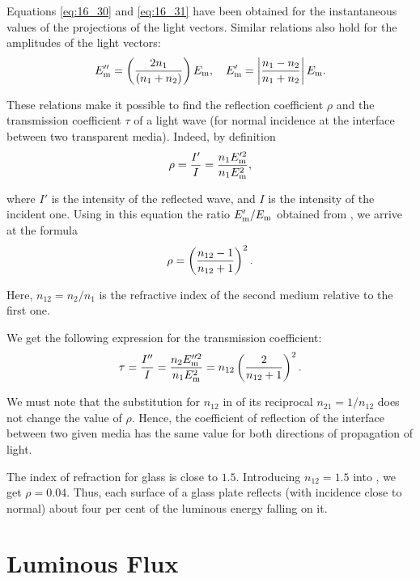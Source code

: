 Equations \eqref{eq:16_30} and \eqref{eq:16_31} have been obtained for the instantaneous values of the projections of the light vectors.
Similar relations also hold for the amplitudes of the light vectors:
\begin{equation}\label{eq:16_32}
    E_{\text{m}}'' = \left(\frac{2 n_1}{(n_1 + n_2)}\right) E_{\text{m}},\quad E_{\text{m}}' = \left| \frac{n_1 - n_2}{n_1 + n_2} \right| E_{\text{m}}.
\end{equation}

\noindent
These relations make it possible to find the reflection coefficient $\rho$ and the transmission coefficient $\tau$ of a light wave (for normal incidence at the interface between two transparent media).
Indeed, by definition
\begin{equation*}
    \rho = \frac{I'}{I} = \frac{n_1 E_{\text{m}}'^2}{n_1 E_{\text{m}}^2},
\end{equation*}

\noindent
where $I'$ is the intensity of the reflected wave, and $I$ is the intensity of the incident one.
Using in this equation the ratio $E_{\text{m}}'/E_{\text{m}}$ obtained from , we arrive at the formula
\begin{equation}\label{eq:16_33}
    \rho = \left(\frac{n_{12} - 1}{n_{12} + 1}\right)^2.
\end{equation}

\noindent
Here, $n_{12} = n_2/n_1$ is the refractive index of the second medium relative to the first one.

We get the following expression for the transmission coefficient:
\begin{equation}\label{eq:16_34}
    \tau = \frac{I''}{I} = \frac{n_2 E_{\text{m}}''^2}{n_1 E_{\text{m}}^2} = n_{12} \left(\frac{2}{n_{12} + 1}\right)^2.
\end{equation}

We must note that the substitution for $n_{12}$ in  of its reciprocal $n_{21} = 1/n_{12}$ does not change the value of $\rho$.
Hence, the coefficient of reflection of the interface between two given media has the same value for both directions of propagation of light.

The index of refraction for glass is close to $1.5$. Introducing $n_{12} = 1.5$ into , we get $\rho = 0.04$.
Thus, each surface of a glass plate reflects (with incidence close to normal) about four per cent of the luminous energy falling on it.

\section{Luminous Flux}\label{sec:16_4}

